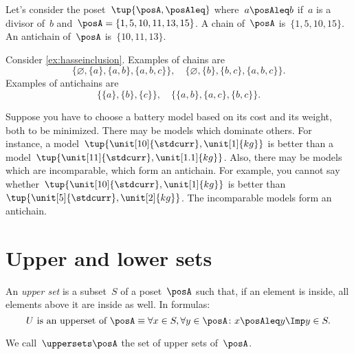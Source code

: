 \begin{example}
  Let's consider the poset~$\tup{\posA,\posAleq}$ where~$a\posAleq b$ if~$a$ is a divisor of~$b$ and~$\posA=\{1,5,10,11,13,15\}$. A chain of~$\posA$ is~$\{1,5,10,15\}$. An antichain of~$\posA$ is~$\{10,11,13\}$.
\end{example}

\begin{example}
  Consider \cref{ex:hasseinclusion}. Examples of chains are
  \begin{equation}
    \{\varnothing,\{a\},\{a,b\},\{a,b,c\}\}, \quad  \{\varnothing,\{b\},\{b,c\},\{a,b,c\}\}.
  \end{equation}
  Examples of antichains are
  \begin{equation}
    \{\{a\},\{b\},\{c\}\}, \quad \{ \{a,b\},\{a,c\}, \{b,c\}\}.
  \end{equation}
\end{example}

\begin{example}
  \label{ex:battery}
  Suppose you have to choose a battery model based on its cost and its weight, both to be minimized.
  There may be models which dominate others.
  For instance, a model~$\tup{\unit[10]{\stdcurr},\unit[1]{kg}}$ is better than a model~$\tup{\unit[11]{\stdcurr},\unit[1.1]{kg}}$.
  Also, there may be models which are incomparable, which form an antichain.
  For example, you cannot say whether~$\tup{\unit[10]{\stdcurr},\unit[1]{kg}}$ is better than~$\tup{\unit[5]{\stdcurr},\unit[2]{kg}}$. The incomparable models form an antichain.
\end{example}


\section{Upper and lower sets}

\begin{definition}
  \label{def:upperset}
  An \emph{upper set} is a subset~$S$ of a poset~$\posA$ such
  that, if an element is inside, all elements above it are inside as well.
  In formulas:
  \begin{equation}
    \text{$U$ is an upperset of $\posA$} \equiv \forall x\in S, \forall y\in \posA \colon x\posAleq y \Imp y\in S.
  \end{equation}
\end{definition}
  We call~$\uppersets \posA$ the set of upper sets of~$\posA$.

